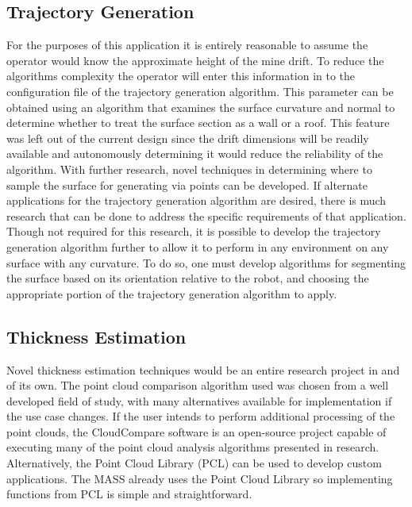 \subsection{Trajectory Generation}

For the purposes of this application it is entirely reasonable to assume the operator would know the approximate height of the mine drift. To reduce the algorithms complexity the operator will enter this information in to the configuration file of the trajectory generation algorithm. This parameter can be obtained using an algorithm that examines the surface curvature and normal to determine whether to treat the surface section as a wall or a roof. This feature was left out of the current design since the drift dimensions will be readily available and autonomously determining it would reduce the reliability of the algorithm. With further research, novel techniques in determining where to sample the surface for generating via points can be developed. If alternate applications for the trajectory generation algorithm are desired, there is much research that can be done to address the specific requirements of that application. Though not required for this research, it is possible to develop the trajectory generation algorithm further to allow it to perform in any environment on any surface with any curvature. To do so, one must develop algorithms for segmenting the surface based on its orientation relative to the robot, and choosing the appropriate portion of the trajectory generation algorithm to apply.\\

\subsection{Thickness Estimation}

Novel thickness estimation techniques would be an entire research project in and of its own. The point cloud comparison algorithm used was chosen from a well developed field of study, with many alternatives available for implementation if the use case changes. If the user intends to perform additional processing of the point clouds, the CloudCompare software is an open-source project capable of executing many of the point cloud analysis algorithms presented in research. Alternatively, the Point Cloud Library (PCL) can be used to develop custom applications. The MASS already uses the Point Cloud Library so implementing functions from PCL is simple and straightforward.\\